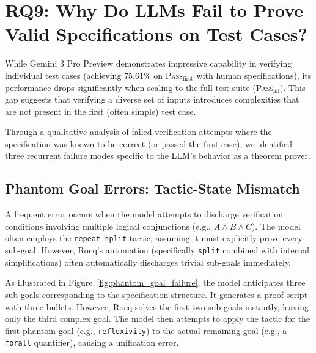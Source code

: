 
\section{RQ9: Why Do LLMs Fail to Prove Valid Specifications on Test Cases?}
\label{appendix:rq9}

While Gemini 3 Pro Preview demonstrates impressive capability in verifying individual test cases (achieving 75.61\% on \textsc{Pass}$_{\text{first}}$ with human specifications), its performance drops significantly when scaling to the full test suite (\textsc{Pass}$_{\text{all}}$). This gap suggests that verifying a diverse set of inputs introduces complexities that are not present in the first (often simple) test case.

Through a qualitative analysis of failed verification attempts where the specification was known to be correct (or passed the first case), we identified three recurrent failure modes specific to the LLM's behavior as a theorem prover.

\subsection{Phantom Goal Errors: Tactic-State Mismatch}
A frequent error occurs when the model attempts to discharge verification conditions involving multiple logical conjunctions (e.g., $A \land B \land C$). The model often employs the \texttt{repeat split} tactic, assuming it must explicitly prove every sub-goal. However, Rocq's automation (specifically \texttt{split} combined with internal simplifications) often automatically discharges trivial sub-goals immediately.

As illustrated in Figure~\ref{fig:phantom_goal_failure}, the model anticipates three sub-goals corresponding to the specification structure. It generates a proof script with three bullets. However, Rocq solves the first two sub-goals instantly, leaving only the third complex goal. The model then attempts to apply the tactic for the first phantom goal (e.g., \texttt{reflexivity}) to the actual remaining goal (e.g., a \texttt{forall} quantifier), causing a unification error.

